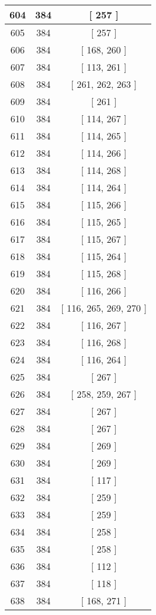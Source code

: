 \begin{center}
\begin{longtable}[H]{|| c c c ||}
\hline
604 & 384 & [ 257 ] \\ 
\hline
605 & 384 & [ 257 ] \\ 
\hline
606 & 384 & [ 168, 260 ] \\ 
\hline
607 & 384 & [ 113, 261 ] \\ 
\hline
608 & 384 & [ 261, 262, 263 ] \\ 
\hline
609 & 384 & [ 261 ] \\ 
\hline
610 & 384 & [ 114, 267 ] \\ 
\hline
611 & 384 & [ 114, 265 ] \\ 
\hline
612 & 384 & [ 114, 266 ] \\ 
\hline
613 & 384 & [ 114, 268 ] \\ 
\hline
614 & 384 & [ 114, 264 ] \\ 
\hline
615 & 384 & [ 115, 266 ] \\ 
\hline
616 & 384 & [ 115, 265 ] \\ 
\hline
617 & 384 & [ 115, 267 ] \\ 
\hline
618 & 384 & [ 115, 264 ] \\ 
\hline
619 & 384 & [ 115, 268 ] \\ 
\hline
620 & 384 & [ 116, 266 ] \\ 
\hline
621 & 384 & [ 116, 265, 269, 270 ] \\ 
\hline
622 & 384 & [ 116, 267 ] \\ 
\hline
623 & 384 & [ 116, 268 ] \\ 
\hline
624 & 384 & [ 116, 264 ] \\ 
\hline
625 & 384 & [ 267 ] \\ 
\hline
626 & 384 & [ 258, 259, 267 ] \\ 
\hline
627 & 384 & [ 267 ] \\ 
\hline
628 & 384 & [ 267 ] \\ 
\hline
629 & 384 & [ 269 ] \\ 
\hline
630 & 384 & [ 269 ] \\ 
\hline
631 & 384 & [ 117 ] \\ 
\hline
632 & 384 & [ 259 ] \\ 
\hline
633 & 384 & [ 259 ] \\ 
\hline
634 & 384 & [ 258 ] \\ 
\hline
635 & 384 & [ 258 ] \\ 
\hline
636 & 384 & [ 112 ] \\ 
\hline
637 & 384 & [ 118 ] \\ 
\hline
638 & 384 & [ 168, 271 ] \\ 

\end{longtable}
\end{center}
